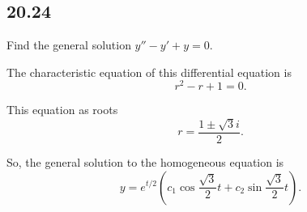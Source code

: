 \documentclass[../hw6]{subfiles}
\begin{document}
\subsection*{20.24}

Find the general solution $y''-y'+y=0$.

The characteristic equation of this differential equation is
\[r^2-r+1=0.\]

This equation as roots \[r=\frac{1\pm\sqrt{3}i}{2}.\]

So, the general solution to the homogeneous equation is
\[y=e^{t/2}\left( c_1\cos{\frac{\sqrt{3}}{2}t}+c_2\sin{\frac{\sqrt{3}}{2}t} \right).\]
\end{document}
